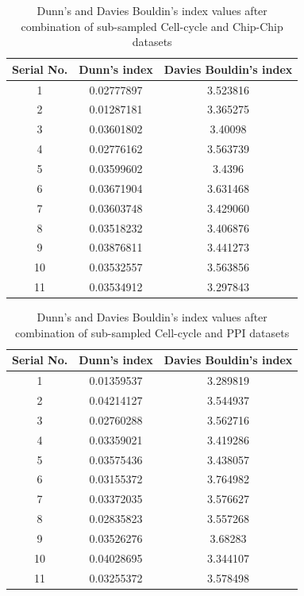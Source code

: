 \begin{table}[p]
\centering
\begin{tabular}{|c|c|c|}
\hline
Serial No. & Dunn’s index  & Davies Bouldin’s index\\
\hline
1 &  0.02777897 & 3.523816 \\
2 & 0.01287181 & 3.365275 \\
3 & 0.03601802 & 3.40098 \\
4 & 0.02776162 & 3.563739 \\
5 & 0.03599602 & 3.4396 \\
6 & 0.03671904 &  3.631468 \\
7 &  0.03603748 & 3.429060 \\
8 &  0.03518232 & 3.406876 \\
9 &  0.03876811 & 3.441273 \\
10 &  0.03532557 & 3.563856 \\
11 &  0.03534912 &  3.297843 \\
\hline 
\end{tabular}
\caption{Dunn's and Davies Bouldin's index values after combination of sub-sampled Cell-cycle and Chip-Chip datasets}
\label{tab:ccycle_chip_perturbed}
\end{table}

\begin{table}[p]
\centering
\begin{tabular}{|c|c|c|}
\hline
Serial No. & Dunn’s index  & Davies Bouldin’s index\\
\hline
1 & 0.01359537 & 3.289819 \\
2 & 0.04214127 & 3.544937 \\
3 & 0.02760288 & 3.562716 \\
4 & 0.03359021 & 3.419286 \\
5 & 0.03575436 & 3.438057 \\
6 & 0.03155372 & 3.764982 \\
7 & 0.03372035 & 3.576627 \\
8 & 0.02835823 & 3.557268 \\
9 & 0.03526276 & 3.68283 \\
10 & 0.04028695 & 3.344107 \\
11 & 0.03255372 & 3.578498 \\
\hline 
\end{tabular}
\caption{Dunn's and Davies Bouldin's index values after combination of sub-sampled Cell-cycle and PPI datasets}
\label{tab:ccycle_ppi_perturbed}
\end{table}

